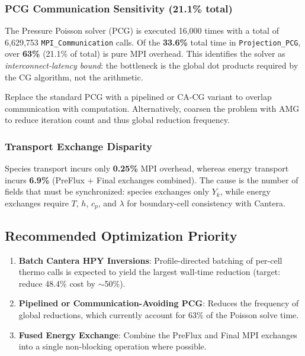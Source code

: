 \documentclass[11pt]{article}
\begin{document}
\subsubsection{PCG Communication Sensitivity (21.1\% total)}

The Pressure Poisson solver (PCG) is executed 16{,}000 times with a total
of 6{,}629{,}753 \texttt{MPI\_Communication} calls. Of the \textbf{33.6\%}
total time in \texttt{Projection\_PCG}, over \textbf{63\%} (21.1\% of total)
is pure MPI overhead. This identifies the solver as \emph{interconnect-latency
bound}: the bottleneck is the global dot products required by the CG
algorithm, not the arithmetic.

\begin{notebox}
Replace the standard PCG with a pipelined or CA-CG variant to overlap
communication with computation. Alternatively, coarsen the problem with
AMG to reduce iteration count and thus global reduction frequency.
\end{notebox}

\subsubsection{Transport Exchange Disparity}

Species transport incurs only \textbf{0.25\%} MPI overhead, whereas energy
transport incurs \textbf{6.9\%} (PreFlux + Final exchanges combined). The
cause is the number of fields that must be synchronized: species exchanges
only $Y_k$, while energy exchanges require $T$, $h$, $c_p$, and $\lambda$
for boundary-cell consistency with Cantera.

\subsection{Recommended Optimization Priority}

\begin{enumerate}[leftmargin=*]
  \item \textbf{Batch Cantera HPY Inversions}: Profile-directed batching of
        per-cell thermo calls is expected to yield the largest wall-time
        reduction (target: reduce 48.4\% cost by $\sim$50\%).
  \item \textbf{Pipelined or Communication-Avoiding PCG}: Reduces the
        frequency of global reductions, which currently account for 63\%
        of the Poisson solve time.
  \item \textbf{Fused Energy Exchange}: Combine the PreFlux and Final MPI
        exchanges into a single non-blocking operation where possible.
\end{enumerate}
\end{document}
